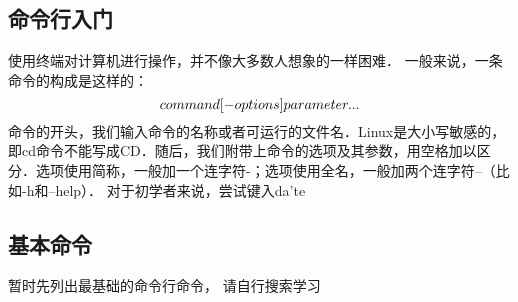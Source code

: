 \subsection{命令行入门}
使用终端对计算机进行操作，并不像大多数人想象的一样困难．
一般来说，一条命令的构成是这样的：
\begin{equation}
command \space [-options]  \space parameter...
\end{equation}
命令的开头，我们输入命令的名称或者可运行的文件名．Linux是大小写敏感的，即cd命令不能写成CD．随后，我们附带上命令的选项及其参数，用空格加以区分．选项使用简称，一般加一个连字符-；选项使用全名，一般加两个连字符--（比如-h和--help）．
对于初学者来说，尝试键入da'te

\subsection{基本命令}
暂时先列出最基础的命令行命令， 请自行搜索学习
